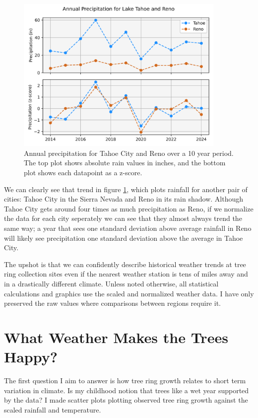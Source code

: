 \documentclass[]{article}
\begin{document}
\begin{figure}[h]
	\centering
	\includegraphics[width=0.9\textwidth]{renotahoe.png}
	\caption{Annual precipitation for Tahoe City and Reno over a 10 year period. The top plot shows absolute rain values in inches, and the bottom plot shows each datapoint as a z-score.}
	\label{fig:reno_tahoe}
\end{figure}
We can clearly see that trend in figure \ref{fig:reno_tahoe}, which plots rainfall for another pair of cities: Tahoe City in the Sierra Nevada and Reno in its rain shadow. Although Tahoe City gets around four times as much precipitation as Reno, if we normalize the data for each city seperately we can see that they almost always trend the same way; a year that sees one standard deviation above average rainfall in Reno will likely see precipitation one standard deviation above the average in Tahoe City.

The upshot is that we can confidently describe historical weather trends at tree ring collection sites even if the nearest weather station is tens of miles away and in a drastically different climate. Unless noted otherwise, all statistical calculations and graphics use the scaled and normalized weather data. I have only preserved the raw values where comparisons between regions require it.

\section{What Weather Makes the Trees Happy?}
\label{sec:reg}
The first question I aim to answer is how tree ring growth relates to short term variation in climate. Is my childhood notion that trees like a wet year supported by the data?  I made scatter plots plotting observed tree ring growth against the scaled rainfall and temperature.
\end{document}
